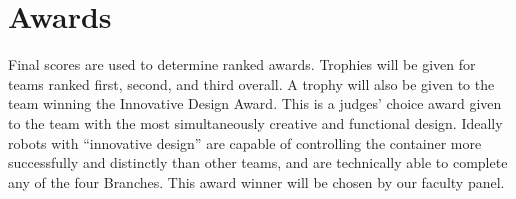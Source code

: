 \section{Awards}

Final scores are used to determine ranked awards. Trophies will be given for teams ranked first, second, and third overall. A trophy will also be given to the team winning the Innovative Design Award. This is a judges’ choice award given to the team with the most simultaneously creative and functional design. Ideally robots with “innovative design” are capable of controlling the container more successfully and distinctly than other teams, and are technically able to complete any of the four Branches. This award winner will be chosen by our faculty panel. 
